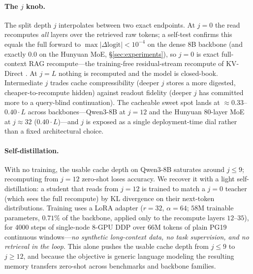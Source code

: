\paragraph{The $j$ knob.} The split depth $j$ interpolates between two exact
endpoints. At $j{=}0$ the read recomputes \emph{all} layers over the retrieved
raw tokens; a self-test confirms this equals the full forward to
$\max|\Delta\text{logit}|<10^{-4}$ on the dense 8B backbone (and exactly
$0.0$ on the Hunyuan MoE, \S\ref{sec:experiments}), so $j{=}0$ is exact
full-context RAG recompute---the training-free residual-stream recompute of
KV-Direct \citep{kvdirect}. At $j{=}L$ nothing is recomputed and the model is
closed-book. Intermediate $j$ trades cache compressibility (deeper $j$ stores a
more digested, cheaper-to-recompute hidden) against readout fidelity (deeper $j$
has committed more to a query-blind continuation). The cacheable sweet spot
lands at $\approx 0.33$--$0.40\!\cdot\!L$ across backbones---Qwen3-8B at
$j{=}12$ and the Hunyuan 80-layer MoE at $j{\approx}32$
($0.40\!\cdot\!L$)---and $j$ is exposed as a single deployment-time dial rather
than a fixed architectural choice.

\paragraph{Self-distillation.} With no training, the usable cache depth on
Qwen3-8B saturates around $j{\le}9$; recomputing from $j{=}12$ zero-shot loses
accuracy. We recover it with a light self-distillation: a student that reads
from $j{=}12$ is trained to match a $j{=}0$ teacher (which sees the full
recompute) by KL divergence on their next-token distributions. Training uses a
LoRA adapter ($r{=}32$, $\alpha{=}64$; $58$M trainable parameters, $0.71\%$ of
the backbone, applied only to the recompute layers $12$--$35$), for $4000$ steps
of single-node 8-GPU DDP over $66$M tokens of plain PG19~\citep{pg19} continuous
windows---\emph{no synthetic
long-context data, no task supervision, and no retrieval in the loop}. This
alone pushes the usable cache depth from $j{\le}9$ to $j{\ge}12$, and because
the objective is generic language modeling the resulting memory transfers
zero-shot across benchmarks and backbone families.

